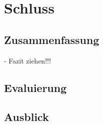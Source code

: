 \chapter{Schluss}
    \label{sec:schluss}

    \section{Zusammenfassung}
    \label{zusammenfassung}
    -   Fazit ziehen!!! \\

    \section{Evaluierung}
    \label{evaluierung}

    \section{Ausblick}
    \label{ausblick}

    \newpage